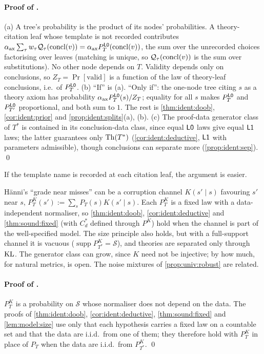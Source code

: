 \paragraph{Proof of .} (a) A tree's probability is the product of its nodes' probabilities. A theory-citation leaf whose template is not recorded contributes $\alpha_{\mathrm{ax}}\sum_\tau w_\tau\mathcal{Q}_\tau(\mathrm{concl}(v))=\alpha_{\mathrm{ax}}P^{\mathord{\mathsf{L0}}}_T(\mathrm{concl}(v))$, the sum over the unrecorded choices factorising over leaves (matching is unique, so $\mathcal{Q}_\tau(\mathrm{concl}(v))$ is the sum over substitutions). No other node depends on $T$. Validity depends only on conclusions, so $Z_T=\Pr[\text{valid}]$ is a function of the law of theory-leaf conclusions, i.e.\ of $P^{\mathord{\mathsf{L0}}}_T$. (b) ``If'' is (a). ``Only if'': the one-node tree citing $s$ as a theory axiom has probability $\alpha_{\mathrm{ax}}P^{\mathord{\mathsf{L0}}}_T(s)/Z_T$; equality for all $s$ makes $P^{\mathord{\mathsf{L0}}}_T$ and $P^{\mathord{\mathsf{L0}}}_{T'}$ proportional, and both sum to $1$. The rest is \cref{thm:ident:doob}, \cref{cor:ident:prior} and \cref{prop:ident:splits}(a), (b). (c) The proof-data generator class of $T^*$ is contained in its conclusion-data class, since equal $\mathord{\mathsf{L0}}$ laws give equal $\mathord{\mathsf{L1}}$ laws; the latter guarantees only $\mathrm{Th}(T^*)$ (\cref{cor:ident:deductive}, $\mathord{\mathsf{L1}}$ with parameters admissible), though conclusions can separate more (\cref{prop:ident:sep}). \qed

If the template name is recorded at each citation leaf, the argument is easier.

\begin{remark}\label{rem:ident:nearmiss}
H\"anni's ``grade near misses'' can be a corruption channel $K(s'\mid s)$ favouring $s'$ near $s$, $P^K_T(s'):=\sum_sP_T(s)K(s'\mid s)$. Each $P^K_T$ is a fixed law with a data-independent normaliser, so \cref{thm:ident:doob}, \cref{cor:ident:deductive} and \cref{thm:sound:fixed} (with $C^*_d$ defined through $P^K$) hold when the channel is part of the well-specified model. The size principle also holds, but with a full-support channel it is vacuous ($\operatorname{supp}P^K_{T^*}=\mathcal S$), and theories are separated only through $\mathrm{KL}$. The generator class can grow, since $K$ need not be injective; by how much, for natural metrics, is open. The noise mixtures of \cref{prop:univ:robust} are related.
\end{remark}

\paragraph{Proof of .} $P^K_T$ is a probability on $\mathcal S$ whose normaliser does not depend on the data. The proofs of \cref{thm:ident:doob}, \cref{cor:ident:deductive}, \cref{thm:sound:fixed} and \cref{lem:model:size} use only that each hypothesis carries a fixed law on a countable set and that the data are i.i.d.\ from one of them; they therefore hold with $P^K_T$ in place of $P_T$ when the data are i.i.d.\ from $P^K_{T^*}$. \qed
